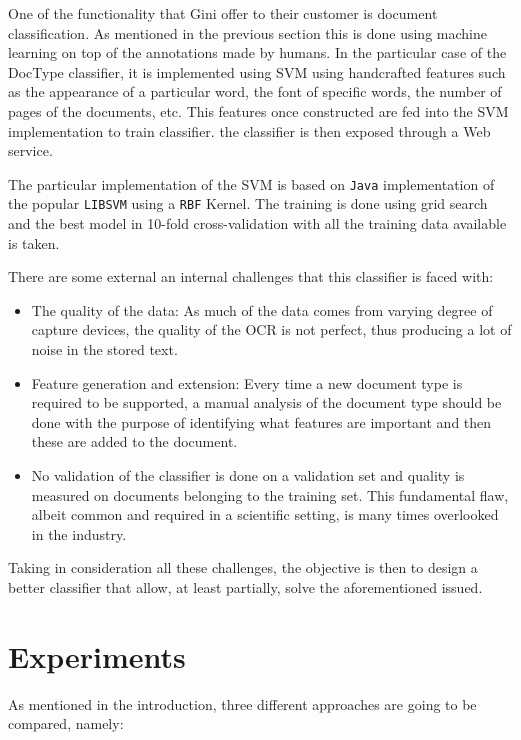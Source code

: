 One of the functionality that Gini offer to their customer is document
classification.  As mentioned in the previous section this is done using
machine learning on top of the annotations made by humans. In the particular
case of the \ac{DocType} classifier, it is implemented using \ac{SVM} using
handcrafted features such as the appearance of a particular word, the font
of specific words, the number of pages of the documents, etc. This features
once constructed are fed into the \ac{SVM} implementation to train classifier. the
classifier is then exposed through a Web service.

The particular implementation of the \ac{SVM} is based on \texttt{Java}
implementation of the popular \texttt{LIBSVM} \cite{CC01a} using a
\texttt{RBF} Kernel.  The training is done using grid search and the best
model in 10-fold cross-validation with all the training data available is
taken.

There are some external an internal challenges that this classifier is faced
with:

\begin{itemize}
\item The quality of the data: As much of the data comes from varying degree
  of capture devices, the quality of the OCR is not perfect, thus producing a
  lot of noise in the stored text.
\item Feature generation and extension: Every time a new document type is
  required to be supported, a manual analysis of the document type should be
  done with the purpose of identifying what features are important and then
  these are added to the document.
\item No validation of the classifier is done on a validation set and quality
  is measured on documents belonging to the training set. This fundamental
  flaw, albeit common and required  in a scientific setting, is many times overlooked in
  the industry.
\end{itemize}

Taking in consideration all these challenges, the objective is then to design
a better classifier that allow, at least partially, solve the
aforementioned issued.



\section{Experiments}
\label{sec:w2vec_doctype_experimental_setup}

As mentioned in the introduction, three different approaches are going to be
compared, namely:


